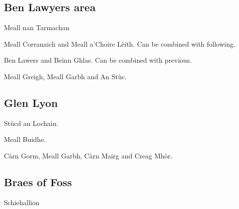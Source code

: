 

\subsection{Ben Lawyers area}

\begin{munros}
\item Meall nan Tarmachan

\item \target Meall Corranaich and Meall a'Choire Lèith.  Can be combined with
  following.

\item \target Ben Lawers and Beinn Ghlas.  Can be combined with previous.

\item Meall Greigh, Meall Garbh and An Stùc.
\end{munros}

\subsection{Glen Lyon}

\begin{munros}
\item
Stùcd an Lochain.

\item
Meall Buidhe.

\item
Càrn Gorm, Meall Garbh, Càrn Mairg and Creag Mhòr.  \tick

\end{munros}


\subsection{Braes of Foss}

\begin{munros}
\item
Schiehallion
\end{munros}
